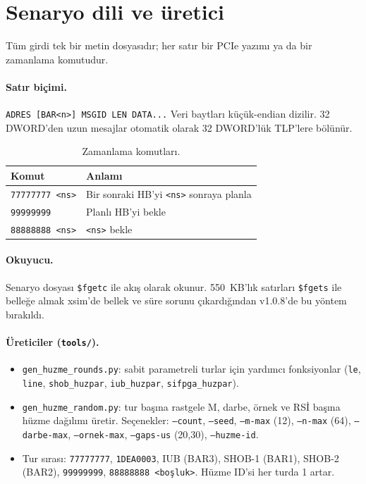 \documentclass[11pt,a4paper]{article}
\newcommand{\kod}[1]{\texttt{#1}}
\begin{document}
\section{Senaryo dili ve üretici}

Tüm girdi tek bir metin dosyasıdır; her satır bir PCIe yazımı ya da bir
zamanlama komutudur.

\paragraph{Satır biçimi.}
\kod{ADRES [BAR<n>] MSGID LEN DATA...} Veri baytları küçük-endian dizilir.
32 DWORD'den uzun mesajlar otomatik olarak 32 DWORD'lük TLP'lere bölünür.

\begin{table}[h]
\centering
\begin{tabular}{@{}ll@{}}
\toprule
Komut & Anlamı \\
\midrule
\kod{77777777 <ns>} & Bir sonraki HB'yi \kod{<ns>} sonraya planla \\
\kod{99999999} & Planlı HB'yi bekle \\
\kod{88888888 <ns>} & \kod{<ns>} bekle \\
\bottomrule
\end{tabular}
\caption{Zamanlama komutları.}
\end{table}

\paragraph{Okuyucu.}
Senaryo dosyası \kod{\$fgetc} ile akış olarak okunur. 550~KB'lık satırları
\kod{\$fgets} ile belleğe almak xsim'de bellek ve süre sorunu çıkardığından
v1.0.8'de bu yöntem bırakıldı.

\paragraph{Üreticiler (\kod{tools/}).}
\begin{itemize}[nosep]
  \item \kod{gen\_huzme\_rounds.py}: sabit parametreli turlar için yardımcı
        fonksiyonlar (\kod{le}, \kod{line}, \kod{shob\_huzpar}, \kod{iub\_huzpar},
        \kod{sifpga\_huzpar}).
  \item \kod{gen\_huzme\_random.py}: tur başına rastgele M, darbe, örnek ve RSİ
        başına hüzme dağılımı üretir. Seçenekler: \kod{--count}, \kod{--seed},
        \kod{--m-max} (12), \kod{--n-max} (64), \kod{--darbe-max}, \kod{--ornek-max},
        \kod{--gaps-us} (20,30), \kod{--huzme-id}.
  \item Tur sırası: \kod{77777777}, \kod{1DEA0003}, IUB (BAR3), SHOB-1 (BAR1),
        SHOB-2 (BAR2), \kod{99999999}, \kod{88888888 <boşluk>}. Hüzme ID'si her
        turda 1 artar.
\end{itemize}
\end{document}
